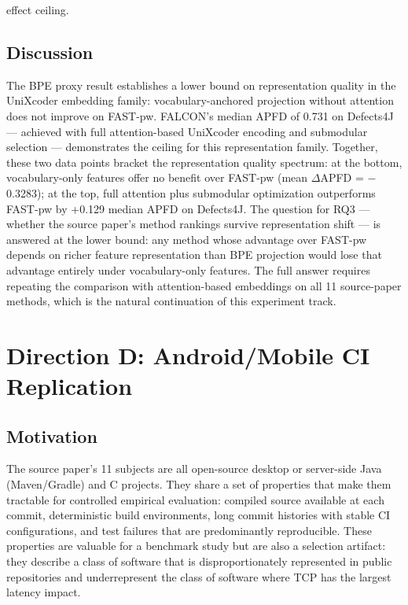 \documentclass[conference]{IEEEtran}
\begin{document}
effect ceiling.


\subsection{Discussion}

The BPE proxy result establishes a lower bound on representation quality in the UniXcoder embedding family: vocabulary-anchored projection without attention does not improve on FAST-pw. FALCON's median APFD of 0.731 on Defects4J~\cite{falcon2025} — achieved with full attention-based UniXcoder encoding and submodular selection — demonstrates the ceiling for this representation family. Together, these two data points bracket the representation quality spectrum: at the bottom, vocabulary-only features offer no benefit over FAST-pw (mean $\Delta$APFD = $-$0.3283); at the top, full attention plus submodular optimization outperforms FAST-pw by +0.129 median APFD on Defects4J. The question for RQ3 — whether the source paper's method rankings survive representation shift — is answered at the lower bound: any method whose advantage over FAST-pw depends on richer feature representation than BPE projection would lose that advantage entirely under vocabulary-only features. The full answer requires repeating the comparison with attention-based embeddings on all 11 source-paper methods, which is the natural continuation of this experiment track.



\section{Direction D: Android/Mobile CI Replication}

\subsection{Motivation}

The source paper's 11 subjects are all open-source desktop or server-side Java (Maven/Gradle) and C projects. They share a set of properties that make them tractable for controlled empirical evaluation: compiled source available at each commit, deterministic build environments, long commit histories with stable CI configurations, and test failures that are predominantly reproducible. These properties are valuable for a benchmark study but are also a selection artifact: they describe a class of software that is disproportionately represented in public repositories and underrepresent the class of software where TCP has the largest latency impact.
\end{document}
